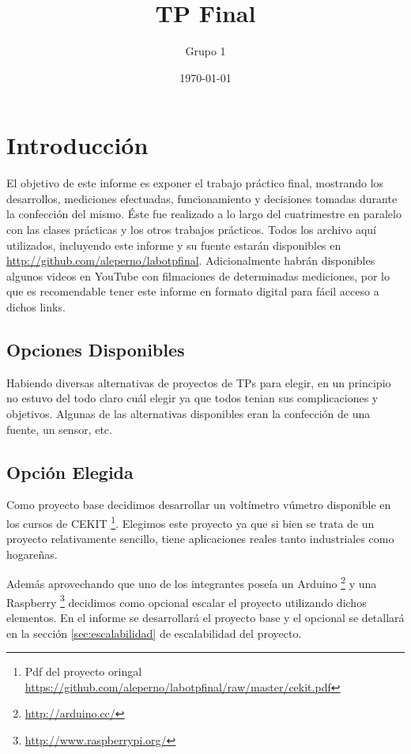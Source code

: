\documentclass[12pt,a4paper]{article}
\title{TP Final}
\author{
        Grupo 1
}
\date{\today}
\begin{document}


\maketitle

\newpage
\tableofcontents

\newpage


\newpage 
\section{Introducción}
	El objetivo de este informe es exponer el trabajo práctico final, mostrando los desarrollos, mediciones efectuadas, funcionamiento y decisiones tomadas durante la confección del mismo. Éste fue realizado a lo largo del cuatrimestre en paralelo con las clases prácticas y los otros trabajos prácticos. Todos los archivo aquí utilizados, incluyendo este informe y su fuente estarán disponibles en \url{http://github.com/aleperno/labotpfinal}. Adicionalmente habrán disponibles algunos videos en YouTube con filmaciones de determinadas mediciones, por lo que es recomendable tener este informe en formato digital para fácil acceso a dichos links.

	\subsection{Opciones Disponibles}
		Habiendo diversas alternativas de proyectos de TPs para elegir, en un principio no estuvo del todo claro cuál elegir ya que todos tenian sus complicaciones y objetivos. Algunas de las alternativas disponibles eran la confección de una fuente, un sensor, etc.

	\subsection{Opción Elegida}
		Como proyecto base decidimos desarrollar un voltímetro vúmetro disponible en los cursos de CEKIT \footnote{Pdf del proyecto oringal \url{https://github.com/aleperno/labotpfinal/raw/master/cekit.pdf}}. Elegimos este proyecto ya que si bien se trata de un proyecto relativamente sencillo, tiene aplicaciones reales tanto industriales como hogareñas.

		Además aprovechando que uno de los integrantes poseía un Arduino \footnote{\url{http://arduino.cc/}} y una Raspberry \footnote{\url{http://www.raspberrypi.org/}} decidimos como opcional escalar el proyecto utilizando dichos elementos. En el informe se desarrollará el proyecto base y el opcional se detallará en la sección \ref{sec:escalabilidad} de escalabilidad del proyecto.
\end{document}
